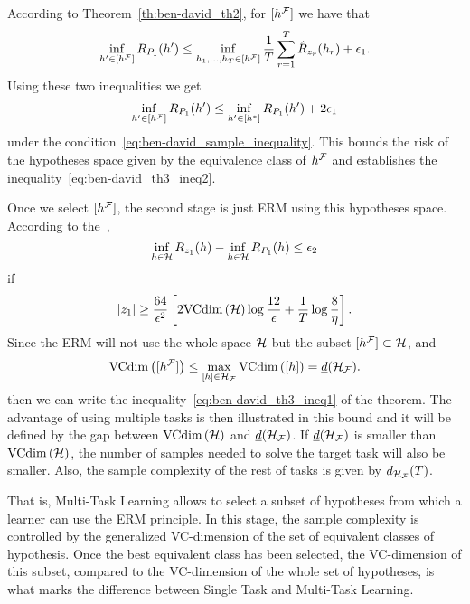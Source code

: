 According to Theorem~\ref{th:ben-david_th2}, for $\lbrack h^{\mathcal{F}}\rbrack$ we have that
\begin{equation}
    \nonumber
    {\inf_{h' \in \lbrack h^{\mathcal{F}}\rbrack}R_{P_1}(h')} \leq \inf_{h_1, \ldots, h_T \in \lbrack h^{\mathcal{F}}\rbrack} \frac{1}{T} \sum_{r=1}^T \hat{R}_{z_r}(h_r)  + \epsilon_1.
\end{equation}
Using these two inequalities we get
\begin{equation}
    \nonumber
    \inf_{h' \in \lbrack h^{\mathcal{F}}\rbrack}R_{P_1}(h') \leq \inf_{h' \in \lbrack h^*\rbrack}R_{P_1}(h') + 2\epsilon_1 
\end{equation}
under the condition~\eqref{eq:ben-david_sample_inequality}. This bounds the risk of the hypotheses space given by the equivalence class of $h^{\mathcal{F}}$ and establishes the inequality~\eqref{eq:ben-david_th3_ineq2}.
%

Once we select $\lbrack h^{\mathcal{F}}\rbrack$, the second stage is just ERM using this hypotheses space.
%
According to the~\cite{vapnik1982estimation},
\begin{equation}\nonumber
    \inf_{h \in \mathcal{H}} R_{z_1}(h) - \inf_{h \in \mathcal{H}} R_{P_1}(h) \leq \epsilon_2
\end{equation}
if
\begin{equation}
    \nonumber
    \left|z_1\right| \geq  \frac{64}{\epsilon^2} \left[2 \text{VCdim}\left(\mathcal{H}\right) \log \frac{12}{\epsilon} + \frac{1}{T}\log\frac{8}{\eta} \right] .
\end{equation}
Since the ERM will not use the whole space $\mathcal{H}$ but the subset $\lbrack h^{\mathcal{F}}\rbrack \subset \mathcal{H}$, and
$$\text{VCdim}\left(\lbrack h^{\mathcal{F}}\rbrack\right) \leq \max_{\lbrack h\rbrack \in \mathcal{H}_{\mathcal{F}}} \text{VCdim}\left(\lbrack h\rbrack\right) = \underline{d}(\mathcal{H}_{\mathcal{F}}).$$
 then we can write the inequality~\eqref{eq:ben-david_th3_ineq1} of the theorem.
%
The advantage of using multiple tasks is then illustrated in this bound and it will be defined by the gap between $\text{VCdim}\left(\mathcal{H}\right)$ and $\underline{d}(\mathcal{H}_{\mathcal{F}})$. If $\underline{d}(\mathcal{H}_{\mathcal{F}})$ is smaller than $\text{VCdim}\left(\mathcal{H}\right)$, the number of samples needed to solve the target task will also be smaller.
Also, the sample complexity of the rest of tasks is given by $d_{\mathcal{H}_{\mathcal{F}}}(T)$.

That is, Multi-Task Learning allows to select a subset of hypotheses from which a learner can use the ERM principle. In this stage, the sample complexity is controlled by the generalized VC-dimension of the set of equivalent classes of hypothesis. Once the best equivalent class has been selected, 
the VC-dimension of this subset, compared to the VC-dimension of the whole set of hypotheses, is what marks the difference between Single Task and Multi-Task Learning.

